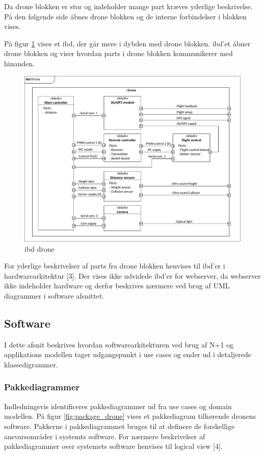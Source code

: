 Da drone blokken er stor og indeholder mange part kræves yderlige beskrivelse. På den følgende side åbnes drone blokken og de interne forbindelser i blokken vises.

\newpage


På figur \ref{fig:ibd_drone} vises et ibd, der går mere i dybden med drone blokken. ibd'et åbner drone blokken og viser hvordan parts i drone blokken kommunikerer med hinanden. 

\begin{figure}[H]
	\centering
	\includegraphics[width=1\textwidth]{Billeder/Projektbeskrivelse/ibd2_drone.pdf}
	\caption{ibd drone}
	\label{fig:ibd_drone}
\end{figure}


For yderlige beskrivelser af parts fra drone blokken henvises til ibd'er i hardwarearkitektur [3].
Der vises ikke udvidede ibd'er for webserver, da webserver ikke indeholder hardware og derfor beskrives nærmere ved brug af UML diagrammer i software afsnittet.



\newpage

\subsection{Software}

I dette afsnit beskrives hvordan softwarearkitekturen ved brug af N+1 og applikations modellen tager udgangspunkt i use cases og ender ud i detaljerede klassedigrammer. 
   
\subsubsection*{Pakkediagrammer}
\vspace{-0.3cm}	
Indledningsvis identificeres pakkediagrammer ud fra use cases og domain modellen. På figur \ref{fig:package_drone} vises et pakkediagram tilhørende dronens software. Pakkerne i pakkediagrammet bruges til at definere de forskellige ansvarsområder i systemts software. For nærmere beskrivelser af pakkediagrammer over systemets software henvises til logical view [4].
 

